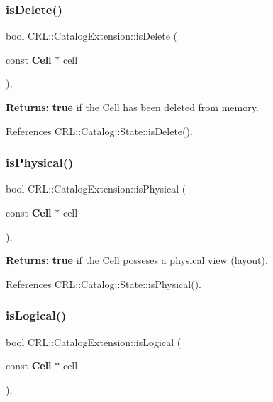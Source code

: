 \subsubsection{\texorpdfstring{is\+Delete()}{isDelete()}}
{\footnotesize\ttfamily bool C\+R\+L\+::\+Catalog\+Extension\+::is\+Delete (\begin{DoxyParamCaption}\item[{const \textbf{ Cell} $\ast$}]{cell }\end{DoxyParamCaption})\hspace{0.3cm}{\ttfamily [inline]}, {\ttfamily [static]}}

{\bfseries Returns\+:} {\bfseries true} if the Cell has been deleted from memory. 

References C\+R\+L\+::\+Catalog\+::\+State\+::is\+Delete().

\mbox{\label{classCRL_1_1CatalogExtension_a3af53ef4a7fa512a079adbcb68677e2f}} 
\subsubsection{\texorpdfstring{is\+Physical()}{isPhysical()}}
{\footnotesize\ttfamily bool C\+R\+L\+::\+Catalog\+Extension\+::is\+Physical (\begin{DoxyParamCaption}\item[{const \textbf{ Cell} $\ast$}]{cell }\end{DoxyParamCaption})\hspace{0.3cm}{\ttfamily [inline]}, {\ttfamily [static]}}

{\bfseries Returns\+:} {\bfseries true} if the Cell posseses a physical view (layout). 

References C\+R\+L\+::\+Catalog\+::\+State\+::is\+Physical().

\mbox{\label{classCRL_1_1CatalogExtension_a558c506a28d2230e592080dccbcca380}} 
\subsubsection{\texorpdfstring{is\+Logical()}{isLogical()}}
{\footnotesize\ttfamily bool C\+R\+L\+::\+Catalog\+Extension\+::is\+Logical (\begin{DoxyParamCaption}\item[{const \textbf{ Cell} $\ast$}]{cell }\end{DoxyParamCaption})\hspace{0.3cm}{\ttfamily [inline]}, {\ttfamily [static]}}


